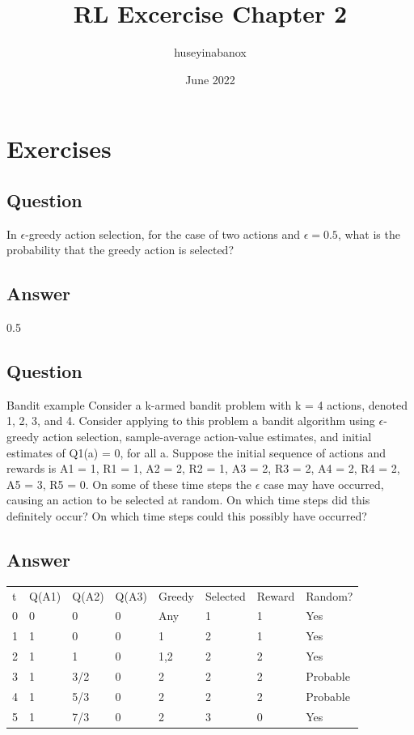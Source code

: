 \documentclass{article}
\title{RL Excercise Chapter 2}
\author{huseyinabanox }
\date{June 2022}
\begin{document}
    \maketitle
    \setcounter{section}{1}


    \section{Exercises}

    \subsection{Question}
    In \(\epsilon\)-greedy action selection, for the case of two actions and \(\epsilon = 0.5 \), what is the probability that the greedy action is selected?

    \subsection*{Answer}

    0.5

    \subsection{Question}

    Bandit example Consider a k-armed bandit problem with k = 4 actions, denoted 1,
    2, 3, and 4. Consider applying to this problem a bandit algorithm using \(\epsilon\)-greedy action selection,
    sample-average action-value estimates, and initial estimates of Q1(a) = 0, for all a. Suppose the initial
    sequence of actions and rewards is A1 = 1, R1 = 1, A2 = 2, R2 = 1, A3 = 2, R3 = 2, A4 = 2, R4 = 2,
    A5 = 3, R5 = 0. On some of these time steps the \(\epsilon\) case may have occurred, causing an action to be
    selected at random. On which time steps did this definitely occur? On which time steps could this
    possibly have occurred?

    \subsection*{Answer}

    \begin{table}[]
        \begin{tabular}{llllllll}
            t & Q(A1) & Q(A2) & Q(A3) & Greedy & Selected & Reward & Random?  \\
            0 & 0     & 0     & 0     & Any    & 1        & 1      & Yes      \\
            1 & 1     & 0     & 0     & 1      & 2        & 1      & Yes      \\
            2 & 1     & 1     & 0     & 1,2    & 2        & 2      & Yes      \\
            3 & 1     & 3/2   & 0     & 2      & 2        & 2      & Probable \\
            4 & 1     & 5/3   & 0     & 2      & 2        & 2      & Probable \\
            5 & 1     & 7/3   & 0     & 2      & 3        & 0      & Yes
        \end{tabular}
    \end{table}
\end{document}
